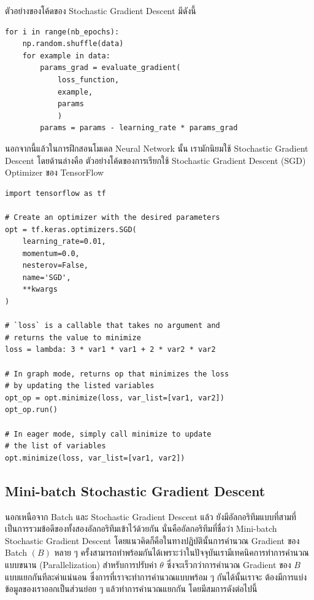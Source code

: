 \noindent ตัวอย่างของโค้ดของ Stochastic Gradient Descent มีดังนี้

\begin{lstlisting}[style=MyPython]
for i in range(nb_epochs):
    np.random.shuffle(data)
    for example in data:
        params_grad = evaluate_gradient(
            loss_function, 
            example, 
            params
            )
        params = params - learning_rate * params_grad
\end{lstlisting}

\vspace{1em}
\noindent นอกจากนี้แล้วในการฝึกสอนโมเดล Neural Network นั้น เรามักนิยมใช้ Stochastic Gradient Descent โดยด้านล่างคือ%
ตัวอย่างโค้ดของการเรียกใช้ Stochastic Gradient Descent (SGD) Optimizer ของ TensorFlow

\begin{lstlisting}[style=MyPython]
import tensorflow as tf

# Create an optimizer with the desired parameters
opt = tf.keras.optimizers.SGD(
    learning_rate=0.01,
    momentum=0.0,
    nesterov=False,
    name='SGD',
    **kwargs
)

# `loss` is a callable that takes no argument and 
# returns the value to minimize
loss = lambda: 3 * var1 * var1 + 2 * var2 * var2

# In graph mode, returns op that minimizes the loss 
# by updating the listed variables
opt_op = opt.minimize(loss, var_list=[var1, var2])
opt_op.run()

# In eager mode, simply call minimize to update 
# the list of variables
opt.minimize(loss, var_list=[var1, var2])
\end{lstlisting}

\subsection{Mini-batch Stochastic Gradient Descent}
\label{ssec:minibatch_grad}

นอกเหนือจาก Batch และ Stochastic Gradient Descent แล้ว ยังมีอัลกอริทึมแบบที่สามที่เป็นการรวมข้อดีของทั้งสองอัลกอริทึมเข้าไว้ด้วยกัน
นั่นคืออัลกอริทึมที่ชื่อว่า Mini-batch Stochastic Gradient Descent โดยแนวคิดก็คือในทางปฏิบัตินั้นการคำนวณ Gradient ของ Batch
$(B)$ หลาย ๆ ครั้งสามารถทำพร้อมกันได้เพราะว่าในปัจจุบันเรามีเทคนิคการทำการคำนวณแบบขนาน (Parallelization) สำหรับการปรับค่า
$\theta$ ซึ่งจะเร็วกว่าการคำนวณ Gradient ของ $B$ แบบแยกกันทีละค่าแน่นอน ซึ่งการที่เราจะทำการคำนวณแบบพร้อม ๆ กันได้นั้นเราจะ%
ต้องมีการแบ่งข้อมูลของเราออกเป็นส่วนย่อย ๆ แล้วทำการคำนวณแยกกัน โดยมีสมการดังต่อไปนี้

